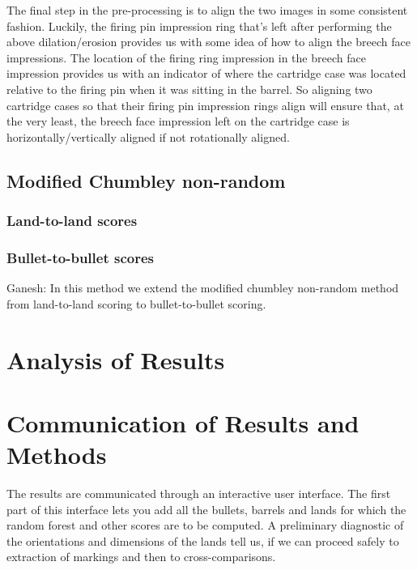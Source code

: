 \documentclass[]{book}
\begin{document}
The final step in the pre-processing is to align the two images in some consistent fashion. Luckily, the firing pin impression ring that's left after performing the above dilation/erosion provides us with some idea of how to align the breech face impressions. The location of the firing ring impression in the breech face impression provides us with an indicator of where the cartridge case was located relative to the firing pin when it was sitting in the barrel. So aligning two cartridge cases so that their firing pin impression rings align will ensure that, at the very least, the breech face impression left on the cartridge case is horizontally/vertically aligned if not rotationally aligned.

\hypertarget{modified-chumbley-non-random}{%
\subsection{Modified Chumbley non-random}\label{modified-chumbley-non-random}}

\hypertarget{land-to-land-scores}{%
\subsubsection{Land-to-land scores}\label{land-to-land-scores}}

\hypertarget{bullet-to-bullet-scores}{%
\subsubsection{Bullet-to-bullet scores}\label{bullet-to-bullet-scores}}

Ganesh: In this method we extend the modified chumbley non-random method from land-to-land scoring to bullet-to-bullet scoring.

\hypertarget{analysis-of-results}{%
\section{Analysis of Results}\label{analysis-of-results}}

\hypertarget{communication-of-results-and-methods}{%
\section{Communication of Results and Methods}\label{communication-of-results-and-methods}}

The results are communicated through an interactive user interface. The first part of this interface lets you add all the bullets, barrels and lands for which the random forest and other scores are to be computed. A preliminary diagnostic of the orientations and dimensions of the lands tell us, if we can proceed safely to extraction of markings and then to cross-comparisons.
\end{document}
